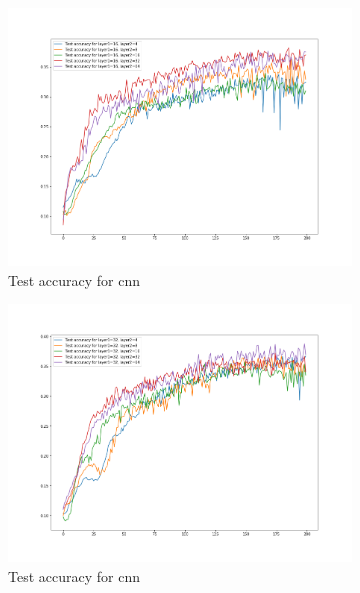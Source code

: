 \begin{figure}[H]
\begin{subfigure}{0.5\textwidth}
        \includegraphics[width=1\linewidth]{assets/plots1/q2_2.png}
        \caption{Test accuracy for cnn}
    \end{subfigure}
    \begin{subfigure}{0.5\textwidth}
        \centering
        \includegraphics[width=1\linewidth]{assets/plots1/q2_3.png}
        \caption{Test accuracy for cnn}
        \label{fig:2_4}
    \end{subfigure}
    \begin{subfigure}{0.5\textwidth}
        \centering

\end{subfigure}
\end{figure}
